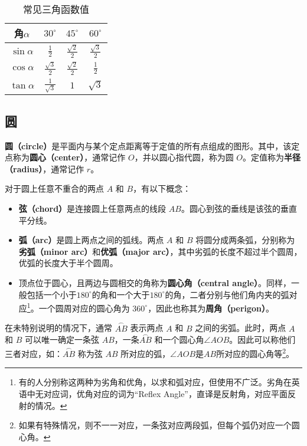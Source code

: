 \begin{table}[ht]
\centering
\caption{常见三角函数值}\label{tab_HsGeBa1}
\begin{tabular}{|c|c|c|c|}
\hline
角$\alpha$ & $30^{\circ}$ & $45^{\circ}$ & $60^{\circ}$ \\
\hline
$\sin\alpha$ & $\displaystyle\frac{1}{2}$ & $\displaystyle\frac{\sqrt{2}}{2}$ & $\displaystyle\frac{\sqrt{3}}{2}$ \\
\hline
$\cos\alpha$ & $\displaystyle\frac{\sqrt{3}}{2}$& $\displaystyle\frac{\sqrt{2}}{2}$ &  $\displaystyle\frac{1}{2}$ \\
\hline
$\tan\alpha$ & $\displaystyle\frac{1}{\sqrt{3}}$ & $1$ & $\sqrt{3}$ \\
\hline
\end{tabular}
\end{table}

\subsection{圆}\label{sub_HsGeBa_1}

\textbf{圆（circle）}是平面内与某个定点距离等于定值的所有点组成的图形。其中，该定点称为\textbf{圆心（center）}，通常记作 $O$，并以圆心指代圆，称为圆 $O$。定值称为\textbf{半径（radius）}，通常记作 $r$。

对于圆上任意不重合的两点 $A$ 和 $B$，有以下概念：
\begin{itemize}
\item \textbf{弦（chord）}是连接圆上任意两点的线段 $AB$。圆心到弦的垂线是该弦的垂直平分线。
\item \textbf{弧（arc）}是圆上两点之间的弧线。两点 $A$ 和 $B$ 将圆分成两条弧，分别称为\textbf{劣弧（minor arc）}和\textbf{优弧（major arc）}，其中劣弧的长度不超过半个圆周，优弧的长度大于半个圆周。
\item 顶点位于圆心，且两边与圆相交的角称为\textbf{圆心角（central angle）}。同样，一般包括一个小于$180^\circ$的角和一个大于$180^\circ$的角，二者分别与他们角内夹的弧对应\footnote{有的人分别称这两种为劣角和优角，以求和弧对应，但使用不广泛。劣角在英语中无对应词，优角对应的词为“Reflex Angle”，直译是反射角，对应平面反射的情况。}。一个圆周对应的圆心角为 $360^\circ$，因此也称其为\textbf{周角（perigon）}。
\end{itemize}

在未特别说明的情况下，通常 $\overset{\frown}{AB}$ 表示两点 $A$ 和 $B$ 之间的劣弧。此时，两点 $A$ 和 $B$ 可以唯一确定一条弦 $AB$，一条$\overset{\frown}{AB}$ 和一个圆心角$\angle AOB$。因此可以称他们三者对应，如：$\overset{\frown}{AB}$ 称为弦 $AB$ 所对应的弧，$\angle AOB$是$AB$所对应的圆心角等\footnote{如果有特殊情况，则不一一对应，一条弦对应两段弧，但每个弧仍对应一个圆心角。}。

